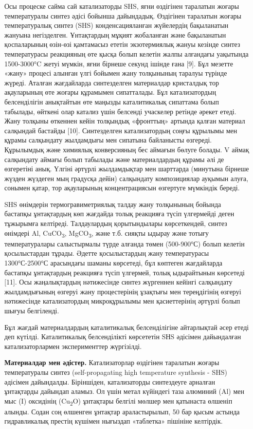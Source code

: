 \begin{multicols}{2}
Осы процеске сайма сай катализаторды SHS, яғни өздігінен таралатын
жоғары температуралы синтез әдісі бойынша дайындадық. Өздігінен
таралатын жоғары температуралық синтез (SHS) конденсацияланған
жүйелердің бақыланатын жануына негізделген. Ұнтақтардың мұқият
жобаланған және бақыланатын қоспаларының өзін-өзі қамтамасыз ететін
экзотермиялық жануы кезінде синтез температурасы реакцияның өте қысқа
болып келетін жалпы алғандағы уақытында 1500-3000°C жетуі мүмкін, яғни
бірнеше секунд ішінде ғана {[}9{]}. Бұл мезетте «жану» процесі алынған
үлгі бойымен жану толқынының таралуы түрінде жүреді. Аталған жағдайларда
синтезделген материалдар кристалдық тор ақауларының өте жоғары құрамымен
сипатталады. Бұл катализатордың белсенділігін анықтайтын өте маңызды
каталитикалық сипаттама болып табылады, өйткені олар катализ үшін
белсенді учаскелер ретінде әрекет етеді. Жану толқыны өткеннен кейін
толқындық «фронттың» артында қалған материал салқындай бастайды
{[}10{]}. Синтезделген катализатордың соңғы құрылымы мен құрамы
салқындату жылдамдығы мен сипатына байланысты өзгереді. Құрылымдық және
химиялық конверсияның бес аймағын бөлуге болады. V аймақ салқындату
аймағы болып табылады және материалдардың құрамы әлі де өзгеретіні анық.
Үлгіні әртүрлі жылдамдықтар мен шарттарда (минутына бірнеше жүзден
жүздеген мың градусқа дейін) салқындату композициялар ауқымын алуға,
сонымен қатар, тор ақауларының концентрациясын өзгертуге мүмкіндік
береді.

SHS өнімдерін термогравиметриялық талдау жану толқынының бойында
бастапқы ұнтақтардың көп жағдайда толық реакцияға түсіп үлгермейді деген
тұжырымға келтіреді. Талдаулардың қорытындылары көрсеткендей, синтез
өнімдері Al, CuCO\textsubscript{3}, MgCO\textsubscript{3}, және т.б.
сияқты ыдырау және тотығу температуралары салыстырмалы түрде алғанда
төмен (500-900°С) болып келетін қосылыстардан тұрады. Әдетте
қосылыстардың жану температурасы 1300°С-2500°С арасындағы шаманы
көрсетеді, бұл көптеген жағдайларда бастапқы ұнтақтардың реакцияға түсіп
үлгермей, толық ыдырайтынын көрсетеді {[}11{]}. Осы жаңалықтардың
нәтижесінде синтез жүргеннен кейінгі салқындату жылдамдығының өзгеруі
жану процестерінің ұзақтығы мен тереңдігінің өзгеруі нәтижесінде
катализатордың микроқұрылымы мен қасиеттерінің әртүрлі болып шығуы
белгіленді.

Бұл жағдай материалдардың каталитикалық белсенділігіне айтарлықтай әсер
етеді деп күтілді. Каталитикалық белсенділікті көрсететін SНS әдісімен
дайындалған катализаторлармен эксперименттер жүргізілді.

{\bfseries Материалдар мен әдістер.} Катализаторлар өздігінен таралатын
жоғары температуралы синтез (self-propagating high temperature synthesis
- SHS) әдісімен дайындалды. Біріншіден, катализаторды синтездеуге
арналған ұнтақтарды дайындап аламыз. Ол үшін метал күйіндегі таза
алюминий (Al) мен мыс (I) оксидінің (Cu\textsubscript{2}O) ұнтақтары
белгілі мөлшер мен қатынаста өлшеніп алынды. Содан соң өлшенген ұнтақтар
араластырылып, 50 бар қысым астында гидравликалық престің күшімен
нығыздап «таблетка» пішініне келтірдік.


\end{multicols}

